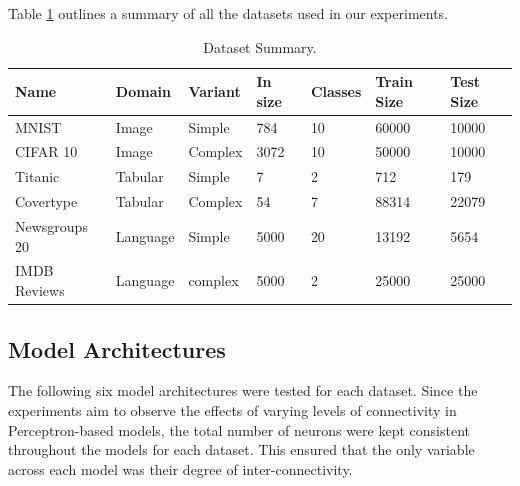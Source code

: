Table \ref{tab:dataSummary} outlines a summary of all the datasets used in our experiments.


\begin{table}[h!]
  \centering
   \begin{tabular}{|l|l|l|l|l|l|l|}
    \hline
    \textbf{Name} & \textbf{Domain} & \textbf{Variant} & \textbf{In size} & \textbf{Classes} & \textbf{Train Size} & \textbf{Test Size} \\
    \hline
    MNIST & Image & Simple & 784 & 10 & 60000 & 10000 \\
    CIFAR 10 & Image & Complex & 3072 & 10 & 50000 & 10000 \\
    Titanic & Tabular & Simple & 7 & 2 & 712 & 179 \\
    Covertype & Tabular & Complex & 54 & 7 & 88314 & 22079 \\
    Newsgroups 20 & Language & Simple & 5000 & 20 & 13192 & 5654 \\
    IMDB Reviews & Language & complex & 5000 & 2 & 25000 & 25000 \\
    \hline
  \end{tabular}
  \caption{Dataset Summary.}
  \label{tab:dataSummary}
\end{table}


\subsection{Model Architectures}
The following six model architectures were tested for each dataset. Since the experiments aim to observe the effects of varying levels of connectivity in Perceptron-based models, the total number of neurons were kept consistent throughout the models for each dataset. This ensured that the only variable across each model was their degree of inter-connectivity.

